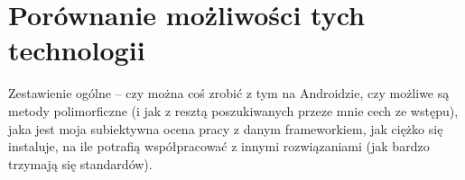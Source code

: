 %
%
%
%
%


\section{Porównanie możliwości tych technologii}
Zestawienie ogólne -- czy można coś zrobić z tym na Androidzie, czy możliwe są metody polimorficzne (i jak z resztą poszukiwanych przeze mnie cech ze wstępu), jaka jest moja subiektywna ocena pracy z danym frameworkiem, jak ciężko się instaluje, na ile potrafią współpracować z innymi rozwiązaniami (jak bardzo trzymają się standardów).

